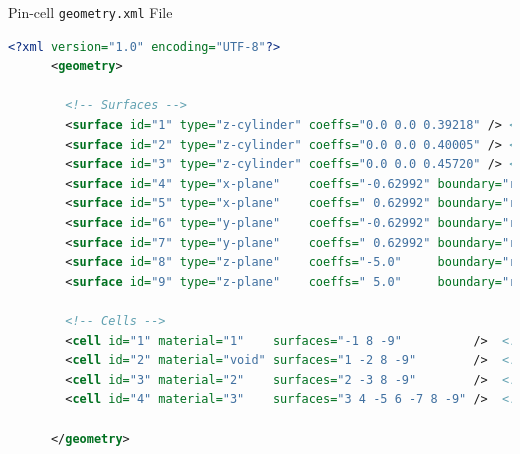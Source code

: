 \documentclass[serif]{beamer}
\begin{document}
\begin{frame}[fragile]{Pin-cell \texttt{geometry.xml} File}
  \vfill
  \begin{scriptsize}
    \begin{lstlisting}[language=XML]
      <?xml version="1.0" encoding="UTF-8"?>
      <geometry>

        <!-- Surfaces -->
        <surface id="1" type="z-cylinder" coeffs="0.0 0.0 0.39218" /> <!-- fuel radius -->
        <surface id="2" type="z-cylinder" coeffs="0.0 0.0 0.40005" /> <!-- clad iradius -->
        <surface id="3" type="z-cylinder" coeffs="0.0 0.0 0.45720" /> <!-- clad oradius -->
        <surface id="4" type="x-plane"    coeffs="-0.62992" boundary="reflective" />
        <surface id="5" type="x-plane"    coeffs=" 0.62992" boundary="reflective" />
        <surface id="6" type="y-plane"    coeffs="-0.62992" boundary="reflective" />
        <surface id="7" type="y-plane"    coeffs=" 0.62992" boundary="reflective" />
        <surface id="8" type="z-plane"    coeffs="-5.0"     boundary="reflective" />
        <surface id="9" type="z-plane"    coeffs=" 5.0"     boundary="reflective" />

        <!-- Cells -->
        <cell id="1" material="1"    surfaces="-1 8 -9"          />  <!-- fuel -->
        <cell id="2" material="void" surfaces="1 -2 8 -9"        />  <!-- gas gap -->
        <cell id="3" material="2"    surfaces="2 -3 8 -9"        />  <!-- clad -->
        <cell id="4" material="3"    surfaces="3 4 -5 6 -7 8 -9" />  <!-- coolant -->

      </geometry>
    \end{lstlisting}
  \end{scriptsize}
  \vfill
\end{frame}

\end{document}
